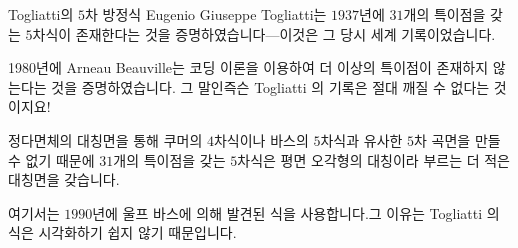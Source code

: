\begin{surferPage}{Togliatti의 $5$차 방정식}
    Eugenio Giuseppe Togliatti는 $1937$년에 $31$개의 특이점을 갖는 $5$차식이 존재한다는 것을 증명하였습니다---이것은 그 당시 세계 기록이었습니다. 


    1980년에 Arneau Beauville는 코딩 이론을 이용하여 더 이상의 특이점이 존재하지 않는다는 것을 증명하였습니다. 
    그 말인즉슨 Togliatti 의 기록은 절대 깨질 수 없다는 것이지요!

	정다면체의 대칭면을 통해 쿠머의 $4$차식이나 바스의 $5$차식과 유사한 $5$차 곡면을 만들 수 없기 때문에 $31$개의 특이점을 갖는 $5$차식은 평면 오각형의 대칭이라 부르는 더 적은 대칭면을 갖습니다.

여기서는 $1990$년에 울프 바스에 의해 발견된 식을 사용합니다.그 이유는 Togliatti 의 식은 시각화하기 쉽지 않기 때문입니다.
\end{surferPage}
